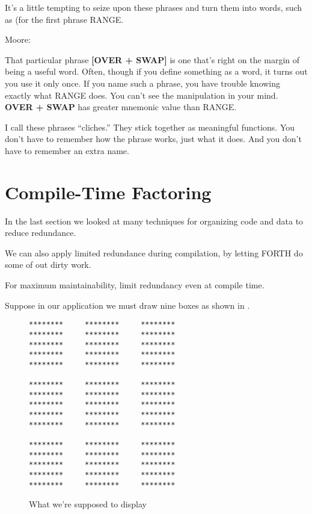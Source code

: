 It's a little tempting to seize upon these phrases and turn them into words, such as (for the first phrase RANGE.

\begin{interview}
Moore:

\begin{tfquot}
That particular phrase \textbf{[OVER + SWAP]} is one that's right on the margin of being a useful word. Often, though if you define something as a word, it turns out you use it only once. If you name such a phrase, you have trouble knowing exactly what RANGE does. You can't see the manipulation in your mind. \textbf{OVER + SWAP} has greater mnemonic value than RANGE.
\end{tfquot}
\end{interview}
I call these phrases ``cliches.'' They stick together as meaningful functions. You don't have to remember how the phrase works, just what it does. And you don't have to remember an extra name.

\section{{Compile-Time Factoring}}

\noindent
In the last section we looked at many techniques for organizing code and data to reduce redundance.

We can also apply limited redundance during compilation, by letting FORTH do some of out dirty work.

\begin{tip}
For maximum maintainability, limit redundancy even at compile time.
\end{tip}
Suppose in our application we must draw nine boxes as shown in .

\begin{figure*}[tttt]
\caption{What we're supposed to display}
\begin{center}
\begin{BVerbatim}
********     ********     ********
********     ********     ********
********     ********     ********
********     ********     ********
********     ********     ********

********     ********     ********
********     ********     ********
********     ********     ********
********     ********     ********
********     ********     ********

********     ********     ********
********     ********     ********
********     ********     ********
********     ********     ********
********     ********     ********
\end{BVerbatim}
\end{center}
\end{figure*}

